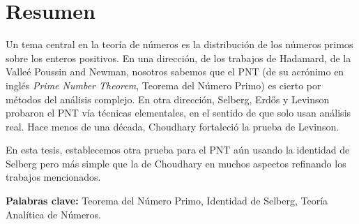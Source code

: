 \chapter*{Resumen}
Un tema central en la teor\'ia de n\'umeros es la distribuci\'on
de los n\'umeros primos sobre los enteros positivos.
En una direcci\'on,
de los trabajos de
Hadamard, de la Valle\'e Poussin and Newman,
nosotros sabemos que el PNT
(de su acrónimo en inglés \textit{Prime Number Theorem}, Teorema del N\'umero Primo)
es cierto por m\'etodos del an\'alisis complejo.
En otra direcci\'on,
Selberg, Erdős y Levinson probaron el PNT
v\'ia t\'ecnicas elementales, en el sentido de que solo usan an\'alisis real.
Hace menos de una d\'ecada,
Choudhary fortaleci\'o la prueba de Levinson.

En esta tesis,
establecemos otra prueba para el PNT
a\'un usando la identidad de Selberg
pero m\'as simple que la de Choudhary en muchos aspectos
refinando los trabajos mencionados.

\bigskip
\textbf{Palabras clave:}
Teorema del N\'umero Primo,
Identidad de Selberg,
Teor\'ia Anal\'itica de N\'umeros.
